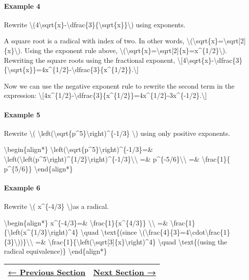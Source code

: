 \hypertarget{example-4}{%
\paragraph{Example 4}\label{example-4}}

Rewrite
\textbackslash{}(4\textbackslash{}sqrt\{x\}-\textbackslash{}dfrac\{3\}\{\textbackslash{}sqrt\{x\}\}\textbackslash{})
using exponents.

A square root is a radical with index of two. In other words,
\textbackslash{}(\textbackslash{}sqrt\{x\}=\textbackslash{}sqrt{[}2{]}\{x\}\textbackslash{}).
Using the exponent rule above,
\textbackslash{}(\textbackslash{}sqrt\{x\}=\textbackslash{}sqrt{[}2{]}\{x\}=x\^{}\{1/2\}\textbackslash{}).
Rewriting the square roots using the fractional exponent,
\textbackslash{}{[}4\textbackslash{}sqrt\{x\}-\textbackslash{}dfrac\{3\}\{\textbackslash{}sqrt\{x\}\}=4x\^{}\{1/2\}-\textbackslash{}dfrac\{3\}\{x\^{}\{1/2\}\}.\textbackslash{}{]}

Now we can use the negative exponent rule to rewrite the second term in
the expression:
\textbackslash{}{[}4x\^{}\{1/2\}-\textbackslash{}dfrac\{3\}\{x\^{}\{1/2\}\}=4x\^{}\{1/2\}-3x\^{}\{-1/2\}.\textbackslash{}{]}

\hypertarget{example-5}{%
\paragraph{Example 5}\label{example-5}}

Rewrite \textbackslash{}(
\textbackslash{}left(\textbackslash{}sqrt\{p\^{}5\}\textbackslash{}right)\^{}\{-1/3\}
\textbackslash{}) using only positive exponents.

\textbackslash{}begin\{align*\}
\textbackslash{}left(\textbackslash{}sqrt\{p\^{}5\}\textbackslash{}right)\^{}\{-1/3\}=\&
\textbackslash{}left(\textbackslash{}left(p\^{}5\textbackslash{}right)\^{}\{1/2\}\textbackslash{}right)\^{}\{-1/3\}\textbackslash{}\textbackslash{}
=\& p\^{}\{-5/6\}\textbackslash{}\textbackslash{} =\&
\textbackslash{}frac\{1\}\{ p\^{}\{5/6\}\} \textbackslash{}end\{align*\}

\hypertarget{example-6}{%
\paragraph{Example 6}\label{example-6}}

Rewrite \textbackslash{}( x\^{}\{-4/3\} \textbackslash{})as a radical.

\textbackslash{}begin\{align*\} x\^{}\{-4/3\}=\&
\textbackslash{}frac\{1\}\{x\^{}\{4/3\}\}
\textbackslash{}\textbackslash{} =\&
\textbackslash{}frac\{1\}\{\textbackslash{}left(x\^{}\{1/3\}\textbackslash{}right)\^{}4\}
\textbackslash{}quad \textbackslash{}text\{(since
\textbackslash{}(\textbackslash{}frac\{4\}\{3\}=4\textbackslash{}cdot\textbackslash{}frac\{1\}\{3\}\textbackslash{}))\}\textbackslash{}\textbackslash{}
=\&
\textbackslash{}frac\{1\}\{\textbackslash{}left(\textbackslash{}sqrt{[}3{]}\{x\}\textbackslash{}right)\^{}4\}
\textbackslash{}quad \textbackslash{}text\{(using the radical
equivalence)\} \textbackslash{}end\{align*\}

\begin{longtable}[]{@{}ll@{}}
\toprule
\endhead
\href{section1-3.php}{← Previous Section} & \href{section1-5.php}{Next
Section →}\tabularnewline
\bottomrule
\end{longtable}
